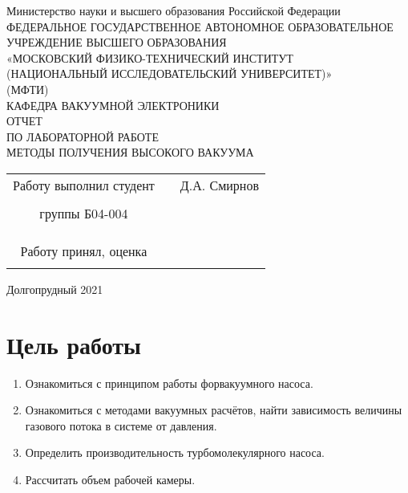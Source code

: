 \documentclass[a4paper]{article}
\begin{document}
 
 \begin{titlepage}
\begin{center}
\hfill \break
Министерство науки и высшего образования Российской Федерации\\
ФЕДЕРАЛЬНОЕ ГОСУДАРСТВЕННОЕ АВТОНОМНОЕ ОБРАЗОВАТЕЛЬНОЕ\\ 
УЧРЕЖДЕНИЕ ВЫСШЕГО ОБРАЗОВАНИЯ\\ 
«МОСКОВСКИЙ ФИЗИКО-ТЕХНИЧЕСКИЙ ИНСТИТУТ\\ 
(НАЦИОНАЛЬНЫЙ ИССЛЕДОВАТЕЛЬСКИЙ УНИВЕРСИТЕТ)»\\
(МФТИ)\\
\hfill \break
\hfill \break
\hfill \break
\hfill \break
\hfill \break
\hfill \break
\hfill \break
\hfill \break
\hfill \break
\hfill \break
\hfill \break
КАФЕДРА ВАКУУМНОЙ ЭЛЕКТРОНИКИ\\
\hfill \break
ОТЧЕТ\\
ПО ЛАБОРАТОРНОЙ РАБОТЕ\\
\hfill \break
МЕТОДЫ ПОЛУЧЕНИЯ ВЫСОКОГО ВАКУУМА\\
\end{center}
\hfill \break
\hfill \break
\hfill \break
\hfill \break
\hfill \break
\hfill \break
\hfill \break
\hfill \break
\begin{tabular}{ccc}
Работу выполнил студент  & \underline{\hspace{5cm}}& Д.А. Смирнов \\\\
группы Б04-004& &   \\\\
 & &  \\\\
Работу принял, оценка & \underline{\hspace{5cm}} &  \\\\
\end{tabular}
\hfill \break
\hfill \break
\begin{center} Долгопрудный 2021 \end{center}
\end{titlepage}
\tableofcontents    
\newpage
\normalsize
\section{Цель работы}
\begin{enumerate}
    \item Ознакомиться с принципом работы форвакуумного насоса.
    \item Ознакомиться с методами вакуумных расчётов, найти зависимость величины газового потока в системе от давления.
    \item Определить производительность турбомолекулярного насоса.
    \item Рассчитать объем рабочей камеры.
\end{enumerate}
\end{document}
